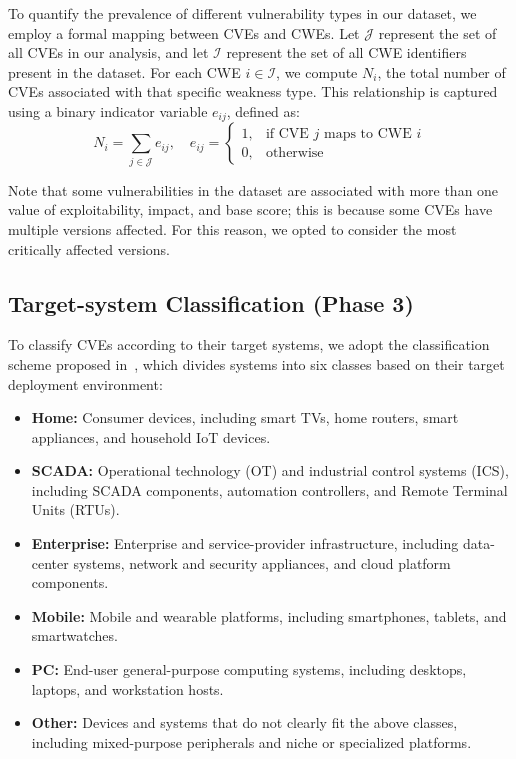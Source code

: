\documentclass[fleqn,s1,names,tex]{neptune}
\begin{document}
To quantify the prevalence of different vulnerability types in our dataset, we employ a formal mapping between CVEs and CWEs. 
Let $\mathcal{J}$ represent the set of all CVEs in our analysis, and let $\mathcal{I}$ represent the set of all CWE identifiers present in the dataset. 
For each CWE $i \in \mathcal{I}$, we compute $N_i$, the total number of CVEs associated with that specific weakness type.
This relationship is captured using a binary indicator variable $e_{ij}$, defined as:
\begin{equation}
N_i = \sum_{j \in \mathcal{J}} e_{ij}, \quad 
    e_{ij} =
\begin{cases}
1, & \text{if CVE } j \text{ maps to CWE } i \\
      0, & \text{otherwise}
\end{cases}
\end{equation}







Note that some vulnerabilities in the dataset are associated with more than one value of exploitability, impact, and base score; this is because some CVEs have multiple versions affected. For this reason, we opted to consider the most critically affected versions.


\subsection{Target-system Classification (\?Phase 3)}


To classify CVEs according to their target systems, we adopt the classification
scheme proposed in~\citet{10.1007/978-3-030-48256-5_9}, which divides systems
into six classes based on their target deployment environment:

\begin{itemize}

\item \textbf{Home:} Consumer devices, including smart TVs, home routers, smart appliances, and household IoT devices.

\item \textbf{SCADA:} Operational technology (OT) and industrial control systems (ICS), including SCADA components, automation controllers, and Remote Terminal Units (RTUs).

\item \textbf{Enterprise:} Enterprise and service-provider infrastructure, including data-center systems, network and security appliances, and cloud platform components.

\item \textbf{Mobile:} Mobile and wearable platforms, including smartphones, tablets, and smartwatches.

\item \textbf{PC:} End-user general-purpose computing systems, including desktops, laptops, and workstation hosts.

\item \textbf{Other:} Devices and systems that do not clearly fit the above classes, including mixed-purpose peripherals and niche or specialized platforms.

\end{itemize}
\end{document}
